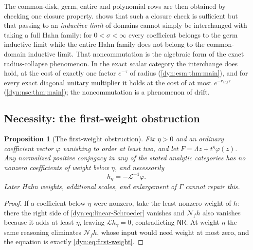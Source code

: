 \documentclass[11pt,letterpaper]{article}
\newtheorem{proposition}[proposition]{Proposition}
\theoremstyle{definition}
\theoremstyle{remark}
\newcommand{\Li}{\mathcal L}
\newcommand{\NN}{\mathcal N}
\newcommand{\nres}{\mathsf{NR}}
\newcommand{\rang}{r_{\mathrm{ang}}}
\numberwithin{equation}{section}
\begin{document}
The common-disk, germ, entire and polynomial rows are then obtained by
checking one closure property.  shows that such a
closure check is sufficient but that passing to an \emph{inductive limit}
of domains cannot simply be interchanged with taking a full Hahn family:
for $0<\sigma<\infty$ every coefficient belongs to the germ inductive
limit while the entire Hahn family does not belong to the common-domain
inductive limit. That noncommutation is the algebraic form of the exact
radius-collapse phenomenon. In the exact scalar category the interchange
does hold, at the cost of exactly one factor $e^{-\tau}$ of radius
(\cref{dyn:esm:thm:main}), and for every exact diagonal unitary multiplier
it holds at the cost of at most $e^{-\rang\tau}$ (\cref{dyn:nsc:thm:main});
the noncommutation is a phenomenon of drift.

\subsection{Necessity: the first-weight obstruction}

\begin{proposition}[The first-weight obstruction]\label{dyn:prop:first-weight}
Fix $\eta>0$ and an ordinary coefficient vector $\varphi$ vanishing to
order at least two, and let $F=\Lambda z+t^{\eta}\varphi(z)$. Any
normalized positive conjugacy in any of the stated analytic categories has
no nonzero coefficients of weight below $\eta$, and necessarily
\begin{equation}\label{dyn:eq:first-weight}
 h_\eta=-\Li^{-1}\varphi .
\end{equation}
Later Hahn weights, additional scales, and enlargement of $\Gamma$ cannot
repair this.
\end{proposition}
\begin{proof}
If a coefficient below $\eta$ were nonzero, take the least nonzero weight
of $h$: there the right side of \eqref{dyn:eq:linear-Schroeder} vanishes
and $\NN_fh$ also vanishes because it adds at least $\eta$, leaving
$\Li h_\gamma=0$, contradicting $\nres$. At weight $\eta$ the same
reasoning eliminates $\NN_fh$, whose input would need weight at most zero,
and the equation is exactly \eqref{dyn:eq:first-weight}.
\end{proof}
\end{document}
